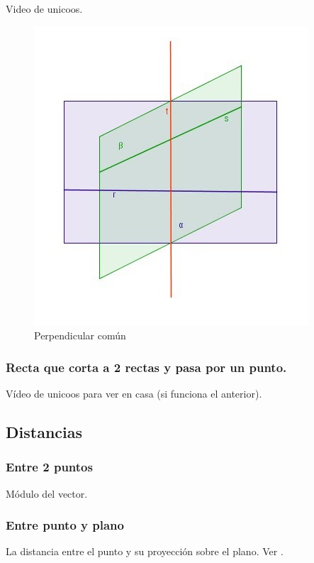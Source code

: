 \begin{problem}
Video de unicoos.
\solution

\end{problem}


\begin{figure}
\centering
\includegraphics[scale=0.7]{img/PerpendicularComun.jpg}
\caption{Perpendicular común}
\label{fig::Perpendicularcomun}
\end{figure}

\subsubsection{Recta que corta a 2 rectas y pasa por un punto.}
Vídeo de unicoos para ver en casa (si funciona el anterior).


\subsection{Distancias}
\subsubsection{Entre 2 puntos}
Módulo del vector.

\subsubsection{Entre punto y plano}

La distancia entre el punto y su proyección sobre el plano. Ver .


